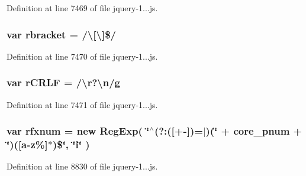 Definition at line 7469 of file jquery-\/1...\+js.

\subsubsection[{\texorpdfstring{rbracket}{rbracket}}]{\setlength{\rightskip}{0pt plus 5cm}var rbracket = /\textbackslash{}\mbox{[}\textbackslash{}\mbox{]}\$/}\hypertarget{_scripts_2jquery-1_810_82_8js_a07117e28ee58d2d2664cfbaf741e10c1}{}\label{_scripts_2jquery-1_810_82_8js_a07117e28ee58d2d2664cfbaf741e10c1}


Definition at line 7470 of file jquery-\/1...\+js.

\subsubsection[{\texorpdfstring{r\+C\+R\+LF}{rCRLF}}]{\setlength{\rightskip}{0pt plus 5cm}var r\+C\+R\+LF = /\textbackslash{}{\bf r}?\textbackslash{}{\bf n}/{\bf g}}\hypertarget{_scripts_2jquery-1_810_82_8js_a4fd9dfc4eb645b441a3e84730c50154b}{}\label{_scripts_2jquery-1_810_82_8js_a4fd9dfc4eb645b441a3e84730c50154b}


Definition at line 7471 of file jquery-\/1...\+js.

\subsubsection[{\texorpdfstring{rfxnum}{rfxnum}}]{\setlength{\rightskip}{0pt plus 5cm}var rfxnum = new Reg\+Exp( \char`\"{}$^\wedge$(?\+:(\mbox{[}+-\/\mbox{]})=$\vert$)(\char`\"{} + core\+\_\+pnum + \char`\"{})(\mbox{[}a-\/z\%\mbox{]}$\ast$)\$\char`\"{}, \char`\"{}{\bf i}\char`\"{} )}\hypertarget{_scripts_2jquery-1_810_82_8js_a7907e208847275b29993c85031275f9f}{}\label{_scripts_2jquery-1_810_82_8js_a7907e208847275b29993c85031275f9f}


Definition at line 8830 of file jquery-\/1...\+js.

